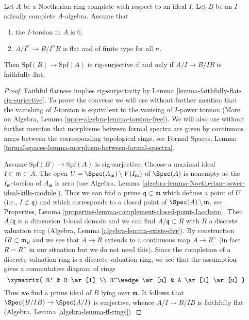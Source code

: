 \begin{lemma}
\label{lemma-flat-rig-surjective}
Let $A$ be a Noetherian ring complete with respect to an ideal $I$.
Let $B$ be an $I$-adically complete $A$-algebra. Assume that
\begin{enumerate}
\item the $I$-torsion in $A$ is $0$,
\item $A/I^n \to B/I^nB$ is flat and of finite type for all $n$.
\end{enumerate}
Then $\text{Spf}(B) \to \text{Spf}(A)$ is rig-surjective if and only
if $A/I \to B/IB$ is faithfully flat.
\end{lemma}

\begin{proof}
Faithful flatness implies rig-surjectivity by
Lemma \ref{lemma-faithfully-flat-rig-surjective}.
To prove the converse we will use without further mention that the
vanishing of $I$-torsion is equivalent to the vanising of $I$-power torsion
(More on Algebra, Lemma \ref{more-algebra-lemma-torsion-free}).
We will also use without further mention that morphisms between
formal spectra are given by continuous maps between the corresponding
topological rings, see
Formal Spaces, Lemma \ref{formal-spaces-lemma-morphism-between-formal-spectra}.

\medskip\noindent
Assume $\text{Spf}(B) \to \text{Spf}(A)$ is rig-surjective.
Choose a maximal ideal $I \subset \mathfrak m \subset A$.
The open $U = \Spec(A_\mathfrak m) \setminus V(I_\mathfrak m)$
of $\Spec(A)$ is nonempty as the $I_\mathfrak m$-torsion of
$A_\mathfrak m$ is zero
(use Algebra, Lemma \ref{algebra-lemma-Noetherian-power-ideal-kills-module}).
Thus we can find a prime $\mathfrak q \subset \mathfrak m$ which defines
a point of $U$ (i.e., $I \not \subset \mathfrak q$)
and which corresponds to a closed point
of $\Spec(A) \setminus \mathfrak m$, see
Properties, Lemma \ref{properties-lemma-complement-closed-point-Jacobson}.
Then $A/\mathfrak q$ is a dimension $1$-local domain and we can find
$A/\mathfrak q \subset R$ with $R$ a discrete valuation ring
(Algebra, Lemma \ref{algebra-lemma-exists-dvr}).
By construction $IR \subset \mathfrak m_R$ and we see that
$A \to R$ extends to a continuous map $A \to R^\wedge$
(in fact $R = R^\wedge$ in our situation but we do not need this).
Since the completion of a discrete valuation ring is a discrete
valuation ring, we see that the assumption gives a commutative
diagram of rings
$$
\xymatrix{
R' & B \ar[l] \\
R^\wedge \ar[u] & A \ar[l] \ar[u]
}
$$
Thus we find a prime ideal of $B$ lying over $\mathfrak m$. It follows
that $\Spec(B/IB) \to \Spec(A/I)$ is surjective, whence $A/I \to B/IB$
is faithfully flat
(Algebra, Lemma \ref{algebra-lemma-ff-rings}).
\end{proof}

